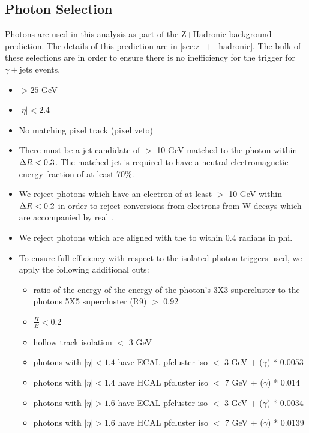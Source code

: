 
  \newpage

  \subsection{Photon Selection} \label{sec:photon_selection}

    Photons are used in this analysis as part of the Z+Hadronic background prediction. The details of this prediction are in \ref{sec:z_+_hadronic}. The bulk of these selections are in order to ensure there is no inefficiency for the trigger for $\gamma +$jets events. 

    \begin{itemize}
      \item \pt $ > 25$ GeV
      \item $|\eta| < 2.4$
      \item No matching pixel track (pixel veto)
      \item There must be a jet candidate of \pt $ >$ 10 GeV matched to the photon within $\Delta R < 0.3$. 
      The matched jet is required to have a neutral electromagnetic energy fraction of at least 70\%.

      \item We reject photons which have an electron of at least \pt $>$ 10 GeV within $\Delta R < 0.2$
      in order to reject conversions from electrons from W decays which are accompanied by real \MET.

      \item We reject photons which are aligned with the \MET to within 0.4 radians in phi.
      \item To ensure full efficiency with respect to the isolated photon triggers used, we apply the following additional cuts:
      \begin{itemize}
        \item ratio of the energy of the energy of the photon's 3X3 supercluster to the photons 5X5 supercluster (R9) $>$ 0.92
        \item $\frac{H}{E} < 0.2$ %
        \item hollow track isolation $<$ 3 GeV
        \item photons with $|\eta| < 1.4$ have ECAL pfcluster iso $<$ 3 GeV + \pt ($\gamma$) * 0.0053
        \item photons with $|\eta| < 1.4$ have HCAL pfcluster iso $<$ 7 GeV + \pt ($\gamma$) * 0.014
        \item photons with $|\eta| > 1.6$ have ECAL pfcluster iso $<$ 3 GeV + \pt ($\gamma$) * 0.0034
        \item photons with $|\eta| > 1.6$ have HCAL pfcluster iso $<$ 7 GeV + \pt ($\gamma$) * 0.0139
      \end{itemize}
    \end{itemize}


